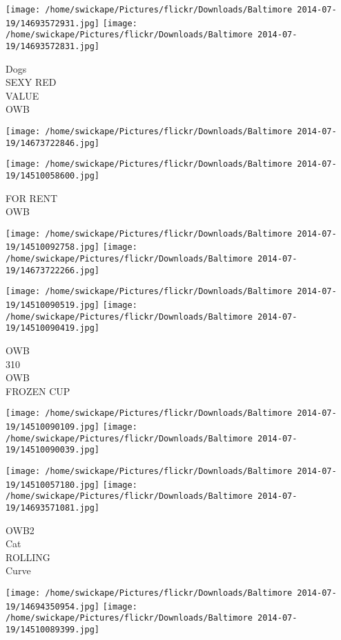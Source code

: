 \documentclass[10pt,letterpaper]{article}
\begin{document}
\texttt{[image: /home/swickape/Pictures/flickr/Downloads/Baltimore 2014-07-19/14693572931.jpg]}
\texttt{[image: /home/swickape/Pictures/flickr/Downloads/Baltimore 2014-07-19/14693572831.jpg]}

Dogs\\
SEXY RED\\
VALUE\\
OWB\\
\pagebreak

\texttt{[image: /home/swickape/Pictures/flickr/Downloads/Baltimore 2014-07-19/14673722846.jpg]}

\vspace{0.25in}
\texttt{[image: /home/swickape/Pictures/flickr/Downloads/Baltimore 2014-07-19/14510058600.jpg]}

FOR RENT\\
OWB\\
\pagebreak

\texttt{[image: /home/swickape/Pictures/flickr/Downloads/Baltimore 2014-07-19/14510092758.jpg]}
\texttt{[image: /home/swickape/Pictures/flickr/Downloads/Baltimore 2014-07-19/14673722266.jpg]}

\texttt{[image: /home/swickape/Pictures/flickr/Downloads/Baltimore 2014-07-19/14510090519.jpg]}
\texttt{[image: /home/swickape/Pictures/flickr/Downloads/Baltimore 2014-07-19/14510090419.jpg]}

OWB\\
310\\
OWB\\
FROZEN CUP\\
\pagebreak

\texttt{[image: /home/swickape/Pictures/flickr/Downloads/Baltimore 2014-07-19/14510090109.jpg]}
\texttt{[image: /home/swickape/Pictures/flickr/Downloads/Baltimore 2014-07-19/14510090039.jpg]}

\texttt{[image: /home/swickape/Pictures/flickr/Downloads/Baltimore 2014-07-19/14510057180.jpg]}
\texttt{[image: /home/swickape/Pictures/flickr/Downloads/Baltimore 2014-07-19/14693571081.jpg]}

OWB2\\
Cat\\
ROLLING\\
Curve\\
\pagebreak

\texttt{[image: /home/swickape/Pictures/flickr/Downloads/Baltimore 2014-07-19/14694350954.jpg]}
\texttt{[image: /home/swickape/Pictures/flickr/Downloads/Baltimore 2014-07-19/14510089399.jpg]}
\end{document}
